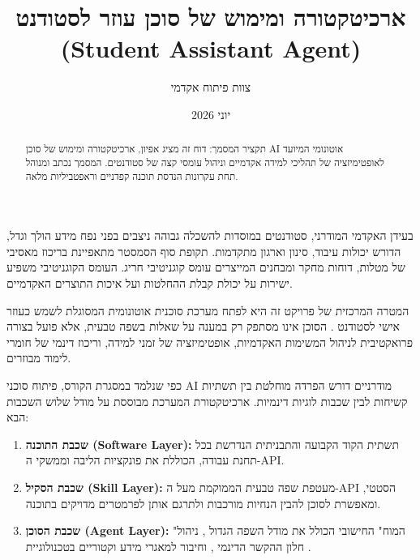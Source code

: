 \documentclass{hebrew-academic-template}
\title{ארכיטקטורה ומימוש של סוכן עוזר לסטודנט (Student Assistant Agent)}
\author{צוות פיתוח אקדמי}
\date{יוני 2026}
\begin{document}
\maketitle

\begin{abstract}
תקציר המסמך: דוח זה מציג אפיון, ארכיטקטורה ומימוש של סוכן AI אוטונומי המיועד לאופטימיזציה של תהליכי למידה אקדמיים וניהול עומסי קצה של סטודנטים. המסמך נכתב ומנוהל תחת עקרונות הנדסת תוכנה קפדניים וראפטביליות מלאה.
\end{abstract}

\tableofcontents
\listoffigures
\listoftables

\newpage


בעידן האקדמי המודרני, סטודנטים במוסדות להשכלה גבוהה ניצבים בפני נפח מידע הולך וגדל, הדורש יכולות עיבוד, סינון וארגון מתקדמות. תקופת סוף הסמסטר מתאפיינת בריכוז מאסיבי של מטלות, דוחות מחקר ומבחנים המייצרים עומס קוגניטיבי חריג. העומס הקוגניטיבי משפיע ישירות על יכולת קבלת ההחלטות ועל איכות התוצרים האקדמיים.

המטרה המרכזית של פרויקט זה היא לפתח מערכת סוכנית אוטונומית המסוגלת לשמש כעוזר אישי לסטודנט . הסוכן אינו מסתפק רק במענה על שאלות בשפה טבעית, אלא פועל בצורה פרואקטיבית לניהול המשימות האקדמיות, אופטימיזציה של זמני למידה, וריכוז דינמי של חומרי לימוד מבוזרים.


כפי שנלמד במסגרת הקורס, פיתוח סוכני AI מודרניים דורש הפרדה מוחלטת בין תשתיות קשיחות לבין שכבות לוגיות דינמיות. ארכיטקטורת המערכת מבוססת על מודל שלוש השכבות הבא:

\begin{enumerate}
    \item \textbf{שכבת התוכנה (Software Layer):} תשתית הקוד הקבועה והתבניתית הנדרשת בכל תחנת עבודה, הכוללת את פונקציות הליבה וממשקי ה-API.
    \item \textbf{שכבת הסקיל (Skill Layer):} מעטפת שפה טבעית הממוקמת מעל ה-API הסטטי, ומאפשרת לסוכן להבין הנחיות מורכבות ולתרגם אותן לפרמטרים מדויקים בתוכנה.
    \item \textbf{שכבת הסוכן (Agent Layer):} "המוח" החישובי הכולל את מודל השפה הגדול , ניהול חלון ההקשר הדינמי , וחיבור למאגרי מידע וקטוריים בטכנולוגיית .
\end{enumerate}
\end{document}
